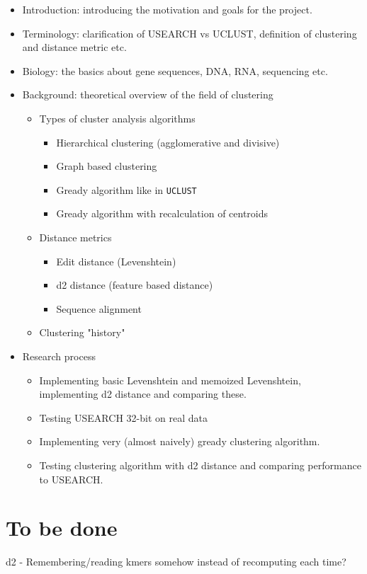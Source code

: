 \documentclass[11pt,a4paper]{article}
\begin{document}
\begin{itemize}
  \item Introduction: introducing the motivation and goals for the project.
    
  \item Terminology: clarification of USEARCH vs UCLUST, definition of
    clustering and distance metric etc.

  \item Biology: the basics about gene sequences, DNA, RNA, sequencing etc.

  \item Background: theoretical overview of the field of clustering
    \begin{itemize}
      \item Types of cluster analysis algorithms
        \begin{itemize}
          \item Hierarchical clustering (agglomerative and divisive)
          \item Graph based clustering
          \item Gready algorithm like in \texttt{UCLUST}
          \item Gready algorithm with recalculation of centroids
        \end{itemize}

      \item Distance metrics
        \begin{itemize}
          \item Edit distance (Levenshtein)
          \item d2 distance (feature based distance)
          \item Sequence alignment
        \end{itemize}

      \item Clustering "history"
    \end{itemize}

  \item Research process
    \begin{itemize}
      \item Implementing basic Levenshtein and memoized Levenshtein,
        implementing d2 distance and comparing these.
      \item Testing USEARCH 32-bit on real data
      \item Implementing very (almost naively) gready clustering algorithm.
      \item Testing clustering algorithm with d2 distance and comparing
        performance to USEARCH.
    \end{itemize}
\end{itemize}


\section{To be done}
d2 - Remembering/reading kmers somehow instead of recomputing each time?






\newpage
\nocite{dong, hazelhurst}


\end{document}
